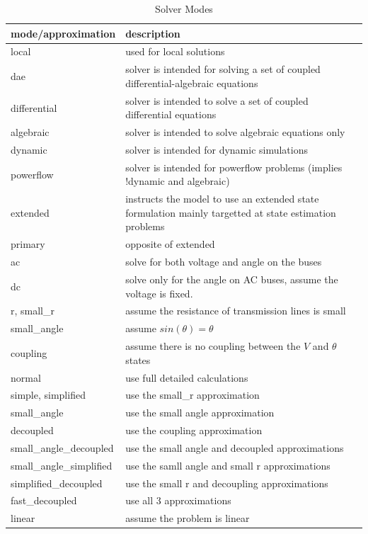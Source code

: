 \documentclass[12pt]{article} %
\begin{document}
   \begin{table}[ht]
   	
   	\caption{Solver Modes} %
   	\centering %
   	\begin{tabular}{l p{10cm}} %
   		\hline %
   		mode/approximation & description \\ [0.5ex] %
   		\hline %
	   	local & used for local solutions \\
	   	dae  & solver is intended for solving a set of coupled differential-algebraic equations \\
	   	differential & solver is intended to solve a set of coupled differential equations \\
	   	algebraic & solver is intended to solve algebraic equations only \\
	   	dynamic & solver is intended for dynamic simulations \\
	   	powerflow & solver is intended for powerflow problems (implies !dynamic and algebraic) \\
	   	extended & instructs the model to use an extended state formulation mainly targetted at state estimation problems \\
	   	primary & opposite of extended \\
	   	ac & solve for both voltage and angle on the buses \\
	   	dc & solve only for the angle on AC buses, assume the voltage is fixed.   \\
	   	r, small\_r & assume the resistance of transmission lines is small \\
	   	small\_angle &  assume $sin(\theta)=\theta$  \\
	   	coupling & assume there is no coupling between the $V$ and $\theta$ states \\
	   	normal & use full detailed calculations \\
	   	simple, simplified & use the small\_r approximation \\
	   	small\_angle & use the small angle approximation \\
	   	decoupled & use the coupling approximation \\
	   	small\_angle\_decoupled & use the small angle and decoupled approximations \\
	   	small\_angle\_simplified & use the samll angle and small r approximations \\
	   	simplified\_decoupled & use the small r and decoupling approximations \\
	   	fast\_decoupled & use all 3 approximations \\
	   	linear & assume the problem is linear \\
	   	
	   	
   		\hline %
   	\end{tabular}
   	\label{table:approxmodes}
   \end{table}
   
\end{document}
